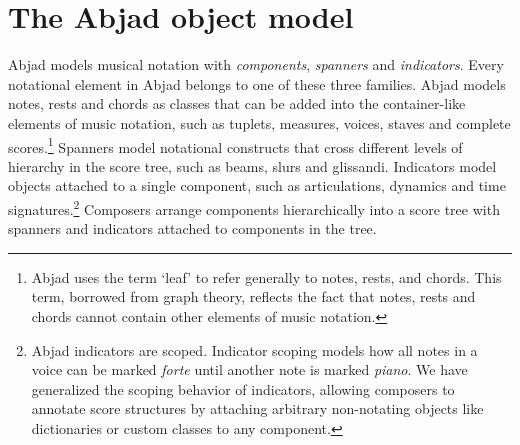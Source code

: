 \documentclass{article}
\begin{document}

\section{The Abjad object model} \label{sec:object-model}

Abjad models musical notation with \emph{components}, \emph{spanners} and
\emph{indicators}. Every notational element in Abjad belongs to one of these
three families. Abjad models notes, rests and chords as classes that can be
added into the container-like elements of music notation, such as tuplets,
measures, voices, staves and complete scores.\footnote{Abjad uses the term
`leaf' to refer generally to notes, rests, and chords. This term, borrowed from
graph theory, reflects the fact that notes, rests and chords cannot contain
other elements of music notation.} Spanners model notational constructs that
cross different levels of hierarchy in the score tree, such as beams, slurs and
glissandi. Indicators model objects attached to a single component, such as
articulations, dynamics and time signatures.\footnote{Abjad indicators are
scoped. Indicator scoping models how all notes in a voice can be marked
\emph{forte} until another note is marked \emph{piano}. We have generalized the
scoping behavior of indicators, allowing composers to annotate score structures
by attaching arbitrary non-notating objects like dictionaries or custom classes
to any component.} Composers arrange components hierarchically into a score
tree with spanners and indicators attached to components in the tree.
\end{document}
